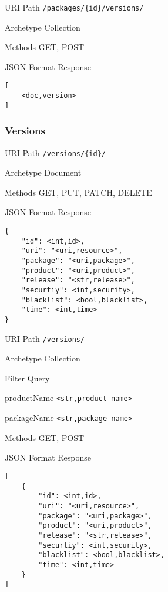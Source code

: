 \documentclass[10pt,a4paper]{scrartcl}
\begin{document}
\begin{mdframed}[style=def]
\begin{description*}
	\item[URI Path] \texttt{/packages/\{id\}/versions/}
	\item[Archetype] Collection
	\item[Methods] GET, POST
	\item[JSON Format Response] \hfill
\begin{lstlisting}
[
	<doc,version>
]
\end{lstlisting}
\end{description*}
\end{mdframed}


\pagebreak
\subsubsection{Versions}

\begin{mdframed}[style=def]
\begin{description*}
	\item[URI Path] \texttt{/versions/\{id\}/}
	\item[Archetype] Document
	\item[Methods] GET, PUT, PATCH, DELETE
	\item[JSON Format Response] \hfill
\begin{lstlisting}
{
	"id": <int,id>,
	"uri": "<uri,resource>",
	"package": "<uri,package>",
	"product": "<uri,product>",
	"release": "<str,release>",
	"securtiy": <int,security>,
	"blacklist": <bool,blacklist>,
	"time": <int,time>
}
\end{lstlisting}
\end{description*}
\end{mdframed}

\begin{mdframed}[style=def]
\begin{description*}
	\item[URI Path] \texttt{/versions/}
	\item[Archetype] Collection
	\item[Filter Query] \hfill
	\begin{description*}
		\item[productName] \texttt{<str,product-name>}
		\item[packageName] \texttt{<str,package-name>}
	\end{description*}
	\item[Methods] GET, POST
	\item[JSON Format Response] \hfill
\begin{lstlisting}
[
	{
		"id": <int,id>,
		"uri": "<uri,resource>",
		"package": "<uri,package>",
		"product": "<uri,product>",
		"release": "<str,release>",
		"securtiy": <int,security>,
		"blacklist": <bool,blacklist>,
		"time": <int,time>
	}
]
\end{lstlisting}
\end{description*}
\end{mdframed}
\end{document}
